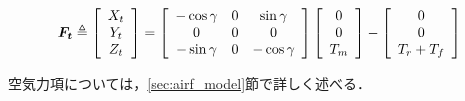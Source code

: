 \begin{equation}
  \mbox{\boldmath $F_t$} \triangleq
  \left[
    \begin{array}{ccc}
      X_t \\
      Y_t \\
      Z_t
    \end{array}
  \right] =
  \left[
    \begin{array}{ccc}
      -\cos\gamma & 0 & \sin\gamma \\
      0 & 0 & 0 \\
      -\sin\gamma & 0 & -\cos\gamma
    \end{array}
  \right]
  \left[
    \begin{array}{ccc}
      0 \\
      0 \\
      T_m
    \end{array}
  \right] -
  \left[
    \begin{array}{ccc}
      0 \\
      0 \\
      T_r + T_f
    \end{array}
  \right]
  \label{eq:F_t}
\end{equation}

空気力項については，\ref{sec:airf_model}節で詳しく述べる．


